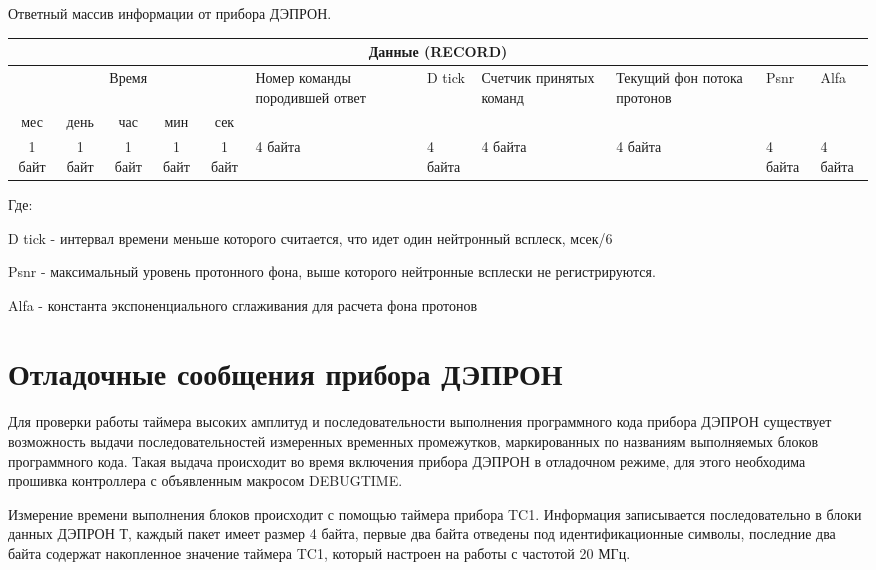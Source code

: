 Ответный массив информации от прибора ДЭПРОН.
\footnotesize
\begin{center}
	\begin{tabularx}{\textwidth}{|*5{c|}|*6{X|}}
		\hline
		\multicolumn{11}{|c|}{Данные 
		(RECORD)}                                                               
		                                                             \\ \hline
		\multicolumn{5}{|c|}{Время}                & Номер команды породившей 
		ответ & D tick  & Счетчик принятых команд & Текущий фон потока протонов 
		& Psnr    
		& Alfa    \\ \cline{1-5}
		 мес   &  день  &  час   &  мин   &  сек   
		 &                                &         &                         
		 &                             &         
		 &  \\ \hline
		1 байт & 1 байт & 1 байт & 1 байт & 1 байт & 4 
		байта                        & 4 байта & 4 байта                 & 4 
		байта                     & 4 байта 
		& 4 байта \\ \hline
	\end{tabularx}  
\end{center}
\normalsize



	Где:


	D tick - интервал времени меньше которого считается, что идет один нейтронный всплеск, мсек/6
	
	Psnr - максимальный уровень протонного фона, выше которого нейтронные всплески не регистрируются.
	
	Alfa - константа экспоненциального сглаживания для расчета фона протонов





\section{Отладочные сообщения прибора ДЭПРОН}



Для проверки работы таймера высоких амплитуд и последовательности выполнения программного кода прибора ДЭПРОН существует возможность выдачи последовательностей измеренных временных промежутков, маркированных по названиям выполняемых блоков программного кода. Такая выдача происходит во время включения прибора ДЭПРОН в отладочном режиме, для этого необходима прошивка контроллера с объявленным макросом DEBUGTIME.


Измерение времени выполнения блоков происходит с помощью таймера прибора TC1. Информация записывается последовательно в блоки данных ДЭПРОН Т, каждый пакет имеет размер 4 байта, первые два байта отведены под идентификационные символы, последние два байта содержат накопленное значение таймера TC1, который настроен на работы с частотой 20 МГц.

